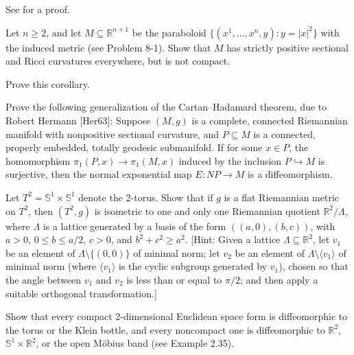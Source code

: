 See \cite{Bre10} for a proof.

\begin{exercise}
\label{exer:paraboloid-positive-curvature}
Let $n \geq 2$, and let $M \subseteq \mathbb{R}^{n+1}$ be the paraboloid $\{(x^1, \ldots, x^n, y) : y = |x|^2\}$ with the induced metric (see Problem 8-1). Show that $M$ has strictly positive sectional and Ricci curvatures everywhere, but is not compact.
\end{exercise}

\begin{exercise}
\label{exer:prove-corollary-12-30}
Prove this corollary.
\end{exercise}

\begin{exercise}
\label{prob:cartan-hadamard-generalization}
Prove the following generalization of the Cartan--Hadamard theorem, due to Robert Hermann [Her63]: Suppose $(M,g)$ is a complete, connected Riemannian manifold with nonpositive sectional curvature, and $P \subseteq M$ is a connected, properly embedded, totally geodesic submanifold. If for some $x \in P$, the homomorphism $\pi_1(P,x) \to \pi_1(M,x)$ induced by the inclusion $P \hookrightarrow M$ is surjective, then the normal exponential map $E : NP \to M$ is a diffeomorphism.
\end{exercise}

\begin{exercise}
\label{prob:classification-flat-tori}
Let $T^2 = \mathbb{S}^1 \times \mathbb{S}^1$ denote the 2-torus. Show that if $g$ is a flat Riemannian metric on $T^2$, then $(T^2, g)$ is isometric to one and only one Riemannian quotient $\mathbb{R}^2/\Lambda$, where $\Lambda$ is a lattice generated by a basis of the form $((a,0), (b,c))$, with $a > 0$, $0 \leq b \leq a/2$, $c > 0$, and $b^2 + c^2 \geq a^2$. [Hint: Given a lattice $\Lambda \subseteq \mathbb{R}^2$, let $v_1$ be an element of $\Lambda \setminus \{(0,0)\}$ of minimal norm; let $v_2$ be an element of $\Lambda \setminus \langle v_1 \rangle$ of minimal norm (where $\langle v_1 \rangle$ is the cyclic subgroup generated by $v_1$), chosen so that the angle between $v_1$ and $v_2$ is less than or equal to $\pi/2$; and then apply a suitable orthogonal transformation.]
\end{exercise}

\begin{exercise}
\label{prob:compact-euclidean-space-forms}
Show that every compact 2-dimensional Euclidean space form is diffeomorphic to the torus or the Klein bottle, and every noncompact one is diffeomorphic to $\mathbb{R}^2$, $\mathbb{S}^1 \times \mathbb{R}^2$, or the open Möbius band (see Example 2.35).
\end{exercise}


